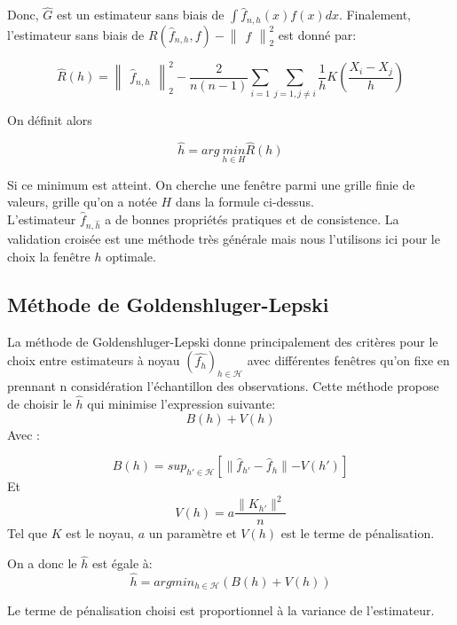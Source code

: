 \documentclass[
]{book}
\begin{document}
Donc, \(\hat{G}\) est un estimateur sans biais de \(\int\hat{f}_{n,h}(x)f(x)dx\). Finalement, l'estimateur sans biais de \(R(\hat{f}_{n,h}, f)-\begin{Vmatrix}{f}\end{Vmatrix}_2^2\) est donné par:

\[
\hat{R}(h)=\begin{Vmatrix}\hat{f}_{n,h}\end{Vmatrix}_2^2-\frac{2}{n(n-1)}\sum_{i=1}\sum_{j=1,j\ne i}\frac{1}{h}K(\frac{X_i-X_j}{h})
\]

On définit alors

\[
\hat{h} = arg\ \underset{h\in H}{min}\hat{R}(h)
\]

Si ce minimum est atteint. On cherche une fenêtre parmi une grille finie de valeurs, grille qu'on a notée \(H\) dans la formule ci-dessus.\\
L'estimateur \(\hat{f}_{n,\hat{h}}\) a de bonnes propriétés pratiques et de consistence.
La validation croisée est une méthode très générale mais nous l'utilisons ici pour le choix la fenêtre \(h\) optimale.

\hypertarget{muxe9thode-de-goldenshluger-lepski}{%
\subsection{Méthode de Goldenshluger-Lepski}\label{muxe9thode-de-goldenshluger-lepski}}

La méthode de Goldenshluger-Lepski donne principalement des critères pour le choix entre estimateurs à noyau \((\hat{f_h})_{h\in \mathcal H}\) avec différentes fenêtres qu'on fixe en prennant n considération l'échantillon des observations.\newline
Cette méthode propose de choisir le \(\hat h\) qui minimise l'expression suivante:
\[
B(h)+V(h)
\]
Avec :

\[
B(h)=sup_{h' \in \mathcal H}{[\parallel\hat f_{h'} - \hat f _h \parallel-V(h')]}
\]
Et
\[
V(h)=a \frac{\parallel K_{h'}\parallel^2}{n}
\]
Tel que \(K\) est le noyau, \(a\) un paramètre et \(V(h)\) est le terme de pénalisation.\newline

On a donc le \(\hat h\) est égale à:
\[
\hat h = arg min_{h \in \mathcal H}(B(h)+V(h))
\]

\begin{rem}
Le terme de pénalisation choisi est proportionnel à la variance de l'estimateur.
\end{rem}
\end{document}
